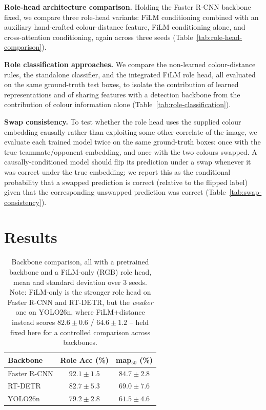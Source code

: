 \documentclass{article}
\begin{document}
\textbf{Role-head architecture comparison.} Holding the Faster R-CNN backbone fixed, we compare three role-head variants: FiLM conditioning combined with an auxiliary hand-crafted colour-distance feature, FiLM conditioning alone, and cross-attention conditioning, again across three seeds (Table~\ref{tab:role-head-comparison}).

\textbf{Role classification approaches.} We compare the non-learned colour-distance rules, the standalone classifier, and the integrated FiLM role head, all evaluated on the same ground-truth test boxes, to isolate the contribution of learned representations and of sharing features with a detection backbone from the contribution of colour information alone (Table~\ref{tab:role-classification}).

\textbf{Swap consistency.} To test whether the role head uses the supplied colour embedding causally rather than exploiting some other correlate of the image, we evaluate each trained model twice on the same ground-truth boxes: once with the true teammate/opponent embedding, and once with the two colours swapped. A causally-conditioned model should flip its prediction under a swap whenever it was correct under the true embedding; we report this as the conditional probability that a swapped prediction is correct (relative to the flipped label) given that the corresponding unswapped prediction was correct (Table~\ref{tab:swap-consistency}).

\section{Results}

\begin{table}[h]
\centering
\begin{tabular}{l|cc}
\textbf{Backbone} & \textbf{Role Acc (\%)} & \textbf{map$_{50}$ (\%)} \\
\hline
Faster R-CNN & $92.1 \pm 1.5$ & $84.7 \pm 2.8$ \\
RT-DETR & $82.7 \pm 5.3$ & $69.0 \pm 7.6$ \\
YOLO26n & $79.2 \pm 2.8$ & $61.5 \pm 4.6$ \\
\end{tabular}
\caption{Backbone comparison, all with a pretrained backbone and a FiLM-only (RGB) role head, mean and standard deviation over 3 seeds. Note: FiLM-only is the stronger role head on Faster R-CNN and RT-DETR, but the \emph{weaker} one on YOLO26n, where FiLM+distance instead scores $82.6 \pm 0.6$ / $64.6 \pm 1.2$ -- held fixed here for a controlled comparison across backbones.}
\label{tab:backbone-comparison}
\end{table}
\end{document}
